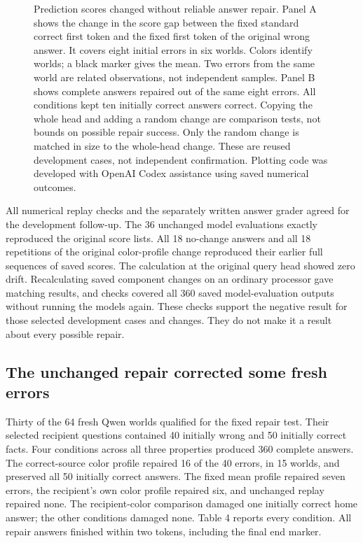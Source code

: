 \documentclass[10pt,letterpaper]{article}
\begin{document}
\begin{figure}[!h]\caption{Prediction scores changed without reliable answer repair. Panel A shows the change in the score gap between the fixed standard correct first token and the fixed first token of the original wrong answer. It covers eight initial errors in six worlds. Colors identify worlds; a black marker gives the mean. Two errors from the same world are related observations, not independent samples. Panel B shows complete answers repaired out of the same eight errors. All conditions kept ten initially correct answers correct. Copying the whole head and adding a random change are comparison tests, not bounds on possible repair success. Only the random change is matched in size to the whole-head change. These are reused development cases, not independent confirmation. Plotting code was developed with OpenAI Codex assistance using saved numerical outcomes.}\label{fig2}\end{figure}

All numerical replay checks and the separately written answer grader agreed for the development follow-up. The 36 unchanged model evaluations exactly reproduced the original score lists. All 18 no-change answers and all 18 repetitions of the original color-profile change reproduced their earlier full sequences of saved scores. The calculation at the original query head showed zero drift. Recalculating saved component changes on an ordinary processor gave matching results, and checks covered all 360 saved model-evaluation outputs without running the models again. These checks support the negative result for those selected development cases and changes. They do not make it a result about every possible repair.


\subsection*{The unchanged repair corrected some fresh errors}

Thirty of the 64 fresh Qwen worlds qualified for the fixed repair test. Their selected recipient questions contained 40 initially wrong and 50 initially correct facts. Four conditions across all three properties produced 360 complete answers. The correct-source color profile repaired 16 of the 40 errors, in 15 worlds, and preserved all 50 initially correct answers. The fixed mean profile repaired seven errors, the recipient's own color profile repaired six, and unchanged replay repaired none. The recipient-color comparison damaged one initially correct home answer; the other conditions damaged none. Table 4 reports every condition. All repair answers finished within two tokens, including the final end marker.
\end{document}
